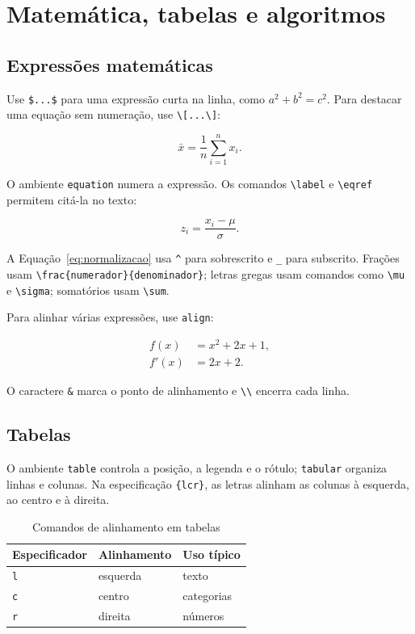 \section{Matemática, tabelas e algoritmos}\label{sec:elementos}

\subsection{Expressões matemáticas}

Use \lstinline|$...$| para uma expressão curta na linha, como $a^2+b^2=c^2$. Para destacar uma equação sem numeração, use \lstinline|\[...\]|:

\[
  \bar{x}=\frac{1}{n}\sum_{i=1}^{n}x_i.
\]

O ambiente \texttt{equation} numera a expressão. Os comandos \lstinline|\label| e \lstinline|\eqref| permitem citá-la no texto:

\begin{equation}\label{eq:normalizacao}
  z_i = \frac{x_i-\mu}{\sigma}.
\end{equation}

A Equação~\eqref{eq:normalizacao} usa \lstinline|^| para sobrescrito e \lstinline|_| para subscrito. Frações usam \lstinline|\frac{numerador}{denominador}|; letras gregas usam comandos como \lstinline|\mu| e \lstinline|\sigma|; somatórios usam \lstinline|\sum|.

Para alinhar várias expressões, use \texttt{align}:

\begin{align}
  f(x) &= x^2 + 2x + 1, \\
  f'(x) &= 2x + 2.
\end{align}

O caractere \lstinline|&| marca o ponto de alinhamento e \lstinline|\\| encerra cada linha.

\subsection{Tabelas}

O ambiente \texttt{table} controla a posição, a legenda e o rótulo; \texttt{tabular} organiza linhas e colunas. Na especificação \lstinline|{lcr}|, as letras alinham as colunas à esquerda, ao centro e à direita.

\begin{table}[H]
  \centering
  \caption{Comandos de alinhamento em tabelas}
  \label{tab:alinhamento}
  \begin{tabular}{lll}
    \toprule
    Especificador & Alinhamento & Uso típico \\
    \midrule
    \texttt{l} & esquerda & texto \\
    \texttt{c} & centro & categorias \\
    \texttt{r} & direita & números \\
    \bottomrule
  \end{tabular}
\end{table}

